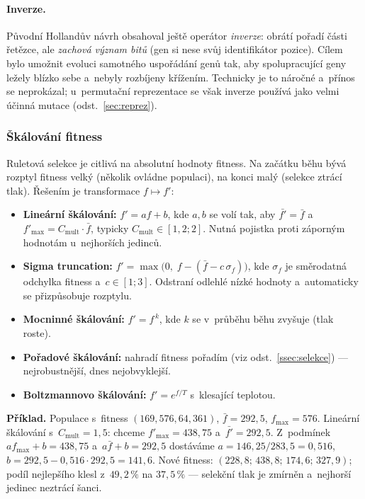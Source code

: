 \documentclass[11pt,a4paper]{article}
\theoremstyle{definition}
\begin{document}
\paragraph{Inverze.} Původní Hollandův návrh obsahoval ještě operátor
\emph{inverze}: obrátí pořadí části řetězce, ale \emph{zachová význam bitů}
(gen si nese svůj identifikátor pozice). Cílem bylo umožnit evoluci samotného
uspořádání genů tak, aby spolupracující geny ležely blízko sebe a~nebyly
rozbíjeny křížením. Technicky je to náročné a~přínos se neprokázal;
u~permutační reprezentace se však inverze používá jako velmi účinná mutace
(odst.~\ref{sec:reprez}).

\subsubsection{Škálování fitness}\label{ssec:skalovani}

Ruletová selekce je citlivá na absolutní hodnoty fitness. Na začátku běhu bývá
rozptyl fitness velký (několik  ovládne populaci), na konci malý
(selekce ztrácí tlak). Řešením je transformace $f \mapsto f'$:

\begin{itemize}
\item \textbf{Lineární škálování:} $f' = a f + b$, kde $a, b$ se volí tak, aby
  $\bar{f'} = \bar{f}$ a~$f'_{\max} = C_{\mathrm{mult}} \cdot \bar{f}$,
  typicky $C_{\mathrm{mult}} \in [1{,}2; 2]$. Nutná pojistka proti záporným
  hodnotám u~nejhorších jedinců.
\item \textbf{Sigma truncation:} $f' = \max\big(0,\; f - (\bar f - c\,\sigma_f)\big)$,
  kde $\sigma_f$ je směrodatná odchylka fitness a~$c \in [1;3]$. Odstraní
  odlehlé nízké hodnoty a~automaticky se přizpůsobuje rozptylu.
\item \textbf{Mocninné škálování:} $f' = f^{\,k}$, kde $k$ se v~průběhu běhu
  zvyšuje (tlak roste).
\item \textbf{Pořadové škálování:} nahradí fitness pořadím (viz
  odst.~\ref{ssec:selekce}) --- nejrobustnější, dnes nejobvyklejší.
\item \textbf{Boltzmannovo škálování:} $f' = e^{f/T}$ s~klesající teplotou.
\end{itemize}

\textbf{Příklad.} Populace s~fitness $(169, 576, 64, 361)$, $\bar f = 292{,}5$,
$f_{\max} = 576$. Lineární škálování s~$C_{\mathrm{mult}} = 1{,}5$:
chceme $f'_{\max} = 438{,}75$ a~$\bar{f'} = 292{,}5$. Z~podmínek
$a f_{\max} + b = 438{,}75$ a~$a \bar f + b = 292{,}5$ dostáváme
$a = 146{,}25/283{,}5 = 0{,}516$, $b = 292{,}5 - 0{,}516 \cdot 292{,}5 = 141{,}6$.
Nové fitness: $(228{,}8;\, 438{,}8;\, 174{,}6;\, 327{,}9)$; podíl nejlepšího
klesl z~$49{,}2\,\%$ na $37{,}5\,\%$ --- selekční tlak je zmírněn a~nejhorší
jedinec neztrácí šanci.
\end{document}
